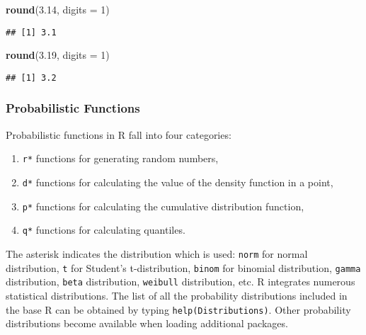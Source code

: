 \documentclass[]{book}
\newenvironment{Shaded}{\begin{snugshade}}{\end{snugshade}}
\newcommand{\KeywordTok}[1]{\textcolor[rgb]{0.13,0.29,0.53}{\textbf{{#1}}}}
\newcommand{\DataTypeTok}[1]{\textcolor[rgb]{0.13,0.29,0.53}{{#1}}}
\newcommand{\DecValTok}[1]{\textcolor[rgb]{0.00,0.00,0.81}{{#1}}}
\newcommand{\FloatTok}[1]{\textcolor[rgb]{0.00,0.00,0.81}{{#1}}}
\newcommand{\NormalTok}[1]{{#1}}
\providecommand{\tightlist}{%
  \setlength{\itemsep}{0pt}\setlength{\parskip}{0pt}}
\def\tightlist{}
\begin{document}
\begin{Shaded}
\begin{Highlighting}[]
\KeywordTok{round}\NormalTok{(}\FloatTok{3.14}\NormalTok{, }\DataTypeTok{digits =} \DecValTok{1}\NormalTok{)}
\end{Highlighting}
\end{Shaded}

\begin{verbatim}
## [1] 3.1
\end{verbatim}

\begin{Shaded}
\begin{Highlighting}[]
\KeywordTok{round}\NormalTok{(}\FloatTok{3.19}\NormalTok{, }\DataTypeTok{digits =} \DecValTok{1}\NormalTok{)}
\end{Highlighting}
\end{Shaded}

\begin{verbatim}
## [1] 3.2
\end{verbatim}

\subsubsection{Probabilistic Functions}\label{probabilistic-functions}

Probabilistic functions in R fall into four categories:

\begin{enumerate}
\def\labelenumi{\arabic{enumi}.}
\tightlist
\item
  \texttt{r*} functions for generating random numbers,
\item
  \texttt{d*} functions for calculating the value of the density
  function in a point,
\item
  \texttt{p*} functions for calculating the cumulative distribution
  function,
\item
  \texttt{q*} functions for calculating quantiles.
\end{enumerate}

The asterisk indicates the distribution which is used: \texttt{norm} for
normal distribution, \texttt{t} for Student's t-distribution,
\texttt{binom} for binomial distribution, \texttt{gamma} distribution,
\texttt{beta} distribution, \texttt{weibull} distribution, etc. R
integrates numerous statistical distributions. The list of all the
probability distributions included in the base R can be obtained by
typing \texttt{help(Distributions)}. Other probability distributions
become available when loading additional packages.
\end{document}

